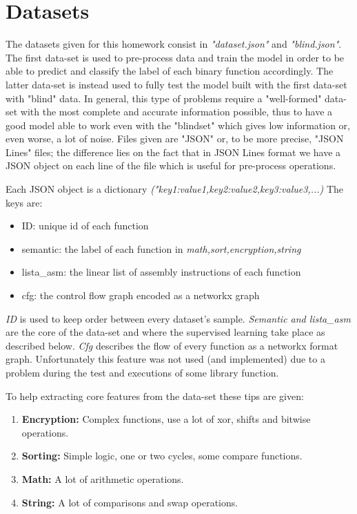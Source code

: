 \documentclass[11pt]{scrartcl}
\begin{document}
\section{Datasets}
\large{The datasets given for this homework consist in \textit{"dataset.json"} and \textit{"blind.json"}.
The first data-set is used to pre-process data and train the model in order to be able to predict and classify the label of each binary function accordingly. The latter data-set is instead used to fully test the model built with the first data-set with "blind" data. \newline
In general, this type of problems require a "well-formed" data-set with the most complete and accurate information possible, thus to have a good model able to work even with the "blindset" which gives low information or, even worse, a lot of noise. \newline
Files given are "JSON" or, to be more precise, "JSON Lines" files; the difference lies on the fact that in JSON Lines format we have a JSON object on each line of the file which is useful for pre-process operations.} \newline

\vspace{0.5cm}

\noindent
Each JSON object is a dictionary \textit{("key1:value1,key2:value2,key3:value3,...)} \newline
The keys are:

\begin{itemize}
	\item ID: unique id of each function
	\item semantic: the label of each function in \textit{math,sort,encryption,string}
	\item lista\_asm: the linear list of assembly instructions of each function
	\item cfg: the control flow graph encoded as a networkx graph
\end{itemize}

\noindent
\large{\textit{ID} is used to keep order between every dataset's sample. \textit{Semantic and lista\_asm} are the core of the data-set and where the supervised learning take place as described below. \textit{Cfg} describes the flow of every function as a networkx format graph. Unfortunately this feature was not used (and implemented) due to a problem during the test and executions of some library function.

\vspace{0.5cm}

\noindent
To help extracting core features from the data-set these tips are given:

\begin{enumerate}
	\item \textbf{Encryption:} Complex functions, use a lot of xor, shifts and bitwise operations.
	\item \textbf{Sorting:} Simple logic, one or two cycles, some compare functions.
	\item \textbf{Math:} A lot of arithmetic operations.
	\item \textbf{String:} A lot of comparisons and swap operations.
\end{enumerate}
}
\end{document}
